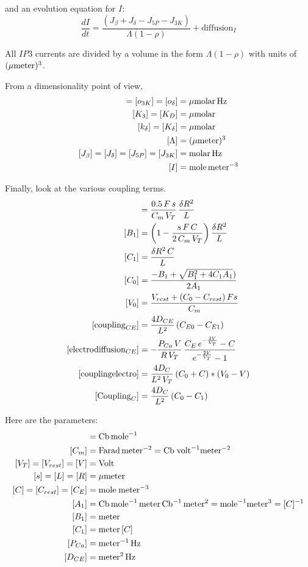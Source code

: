 \documentclass{article}
\begin{document}
and an evolution equation for $I$: 
$$
\frac{dI}{dt} = \frac{(J_\beta + J_\delta - J_{5P} - J_{3K})}{\Lambda(1-\rho)} + \text{diffusion}_I
$$

All $IP3$ currents are divided by a volume in the form $\Lambda(1-\rho)$ with units of $(\mu\meter)^3$. 

From a dimensionality point of view, 
\begin{align}
[o_{5P}] = [o_{3K}] = [\odelta] &= \mu\molar\,\Hz \\
[K_3] = [K_D] &= \mu\molar \\
[\kdelta] = [\Kdelta] &= \mu\molar \\
[\Lambda] &= (\mu\meter)^3 \\
[J_\beta] = [J_\delta] = [J_{5P}] = [J_{3K}] &= \molar \, \Hz \\
[I] &= \mole \, \meter^{-3}
\end{align}


\def\couplingCe{\text{coupling}_{CE}}
\def\electrodiffusion{\text{electrodiffusion}_{CE}}
\def\couplingelectro{\text{couplingelectro}}
\def\couplingC{\text{Coupling}_C}

\newpage
Finally, look at the various coupling terms. 
\begin{align}
[A_1] &= \frac{0.5\, F \, s}{C_m \, V_T} \, \frac{\dRtwo}{L} \\
[B_1] &= \left(1 - \frac{s \, F \, C}{2\, C_m \, V_T}\right) \frac{\dRtwo}{L}   \\
[C_1] &= \frac{\dRtwo \, C}{L}   \\
[C_0] &= \frac{-B_1 + \sqrt{B_1^2 + 4C_1 A_1})}{2 A_1} \\
[V_0] &= \frac{V_{rest} + (C_0 - C_{rest}) \, F  s}{C_m}  \\
[\couplingCe] &= \frac{4 D_{CE} }{L^2} \, (C_{E0}-C_{E1}) \\
[\electrodiffusion] &= -\frac{P_{Ca} \, V}{R \, V_T} \, \frac{C_E\, e^{-\frac{2V}{V_T}} - C} {e^{-\frac{2V}{V_T}} - 1}  \\
[\couplingelectro]  &= \frac{4 D_C}{L^2 \, V_T} \, (C_0 + C) * (V_0 - V)   \\
[\couplingC]        &= \frac{4 D_C}{L^2} \, (C_0 - C_1) 
\end{align}

Here are the parameters: 
\begin{align}
[F] &= \text{Cb} \, \mole^{-1}   \\
[C_m] &= \text{Farad} \, \meter^{-2}  = \text{Cb} \; \text{volt}^{-1} \meter^{-2} \\
[V_T] = [V_{rest}] = [V] &= \text{Volt} \\
[s] = [L] = [R] &= \mu\meter \\
[C] = [C_{rest}] = [C_E] &= \mole \; \meter^{-3} \\
[A_1] &= \text{Cb} \, \mole^{-1} \, \meter \, \text{Cb}^{-1} \, \meter^2 = \mole^{-1} \meter^3  = [C]^{-1} \\
[B_1] &= \meter \\
[C_1] &=  \meter \, [C] \\
[P_{Ca}] &= \meter^{-1} \, \Hz \\
[D_{CE}] &= \meter^2 \, \Hz 
\end{align}
\end{document}
